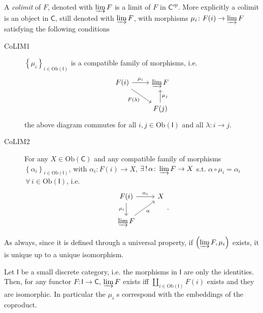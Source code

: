 \begin{defn}
	A {\em colimit} of $F$, denoted with $\varinjlim F$ is a limit of $F$ in $\mathsf{C}^{op}$.
	More explicitly a colimit is an object in $\mathsf{C}$, still denoted with $\varinjlim F$, 
	with morphisms $\mu_i\colon F(i) \to \varinjlim F$ satisfying the following conditions
	\begin{description}
		\item[CoLIM1] $\left\{ \mu_i \right\}_{i \in \mathrm{Ob} \left(\mathsf{I}\right)}$ is a compatible family of morphisms, i.e.
			\begin{equation}
			\begin{tikzcd}
				F(i) \arrow[r, "\mu_i", rightarrow] \arrow[rd, "F(\lambda)"', rightarrow] &
				\varinjlim F \\
				&
				F(j) \arrow[u, "\mu_j"', rightarrow] 
			\end{tikzcd}
			\end{equation} 
			the above diagram commutes for all $i, j \in \mathrm{Ob} \left(\mathsf{I}\right)$ and all $\lambda\colon i \to j$.
		\item[CoLIM2] For any $X \in \mathrm{Ob} \left(\mathsf{C}\right)$ and any compatible family of morphisms
			$\left\{ \alpha_i \right\}_{i \in \mathrm{Ob} \left(\mathsf{I}\right)}$, 
			with $\alpha_i\colon F(i) \to X$, 
			$\exists\, !\, \alpha\colon \varinjlim F \to X$ s.t. 
			$\alpha \circ \mu_i = \alpha_i$ $\,\forall\, i \in \mathrm{Ob} \left(\mathsf{I}\right)$, i.e.
			\begin{equation}
			\begin{tikzcd}
				F(i) \arrow[r, "\alpha_i", rightarrow] \arrow[d, "\mu_i"', rightarrow] &
				X\\
				\varinjlim F \arrow[ru, "\alpha"', rightarrow]  
			\end{tikzcd}
			.\end{equation} 
	\end{description} 
\end{defn}

\begin{rem}
	As always, since it is defined through a universal property, if $\left(\varinjlim F, \mu_i \right)$ exists,
	it is unique up to a unique isomorphism.
\end{rem}

\begin{ex}
	Let $\mathsf{I}$ be a small discrete category, i.e. the morphisms in $\mathsf{I}$ are only the identities.
	Then, for any functor $F\colon \mathsf{I} \to \mathsf{C}$, $\varinjlim F$ exists iff
	$\coprod_{i \in \mathrm{Ob} \left(\mathsf{I}\right)} F(i)$ exists and they are isomorphic.
	In particular the $\mu_i$ s correspond with the embeddings of the coproduct.
\end{ex} 

